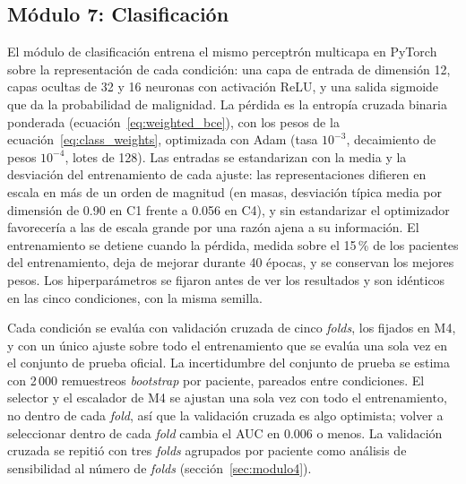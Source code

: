 
\subsection{Módulo 7: Clasificación}
\label{sec:modulo7}

El módulo de clasificación entrena el mismo perceptrón multicapa en PyTorch sobre la
representación de cada condición: una capa de entrada de dimensión 12, capas ocultas de 32 y 16
neuronas con activación ReLU, y una salida sigmoide que da la probabilidad de malignidad. La pérdida
es la entropía cruzada binaria ponderada (ecuación~\eqref{eq:weighted_bce}), con los pesos de la
ecuación~\eqref{eq:class_weights}, optimizada con Adam (tasa $10^{-3}$, decaimiento de pesos
$10^{-4}$, lotes de 128). Las entradas se estandarizan con la media y la desviación del
entrenamiento de cada ajuste: las representaciones difieren en escala en más de un orden de magnitud (en masas, desviación típica media por dimensión de 0.90 en C1 frente a 0.056 en C4), y
sin estandarizar el optimizador favorecería a las de escala grande por una razón ajena a su
información. El entrenamiento se detiene cuando la pérdida, medida sobre el 15\,\% de los pacientes
del entrenamiento, deja de mejorar durante 40 épocas, y se conservan los mejores pesos. Los
hiperparámetros se fijaron antes de ver los resultados y son idénticos en las cinco condiciones, con
la misma semilla.

Cada condición se evalúa con validación cruzada de cinco \textit{folds}, los fijados en M4, y con un
único ajuste sobre todo el entrenamiento que se evalúa una sola vez en el conjunto de prueba oficial.
La incertidumbre del conjunto de prueba se estima con 2\,000 remuestreos \textit{bootstrap} por
paciente, pareados entre condiciones. El selector y el escalador de M4 se ajustan una sola vez con todo
el entrenamiento, no dentro de cada \textit{fold}, así que la validación cruzada es algo optimista;
volver a seleccionar dentro de cada \textit{fold} cambia el AUC en 0.006 o menos. La validación cruzada se
repitió con tres \textit{folds} agrupados por paciente como análisis de sensibilidad al número de
\textit{folds} (sección~\ref{sec:modulo4}).

